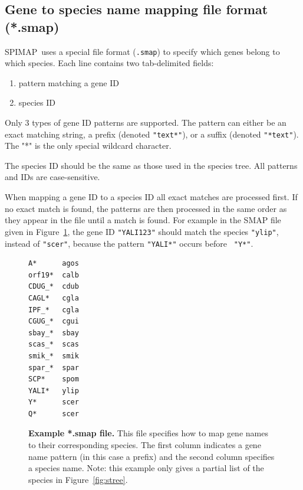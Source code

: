 \documentclass[11pt]{article}
\newcommand{\figref}[1]{Figure~\ref{#1}}
\newcommand{\spimap}{{\sf\scshape SPIMAP}}
\begin{document}
\subsection{Gene to species name mapping file format (*.smap)}
\label{sec:file:smap}

\spimap\ uses a special file format ({\tt *.smap}) to specify which
genes belong to which species. Each line contains two tab-delimited
fields: 
\begin{enumerate}[itemsep=0pt,topsep=0pt]
\item pattern matching a gene ID
\item species ID
\end{enumerate}

Only 3 types of gene ID patterns are supported.  The pattern can
either be an exact matching string, a prefix (denoted {\tt "text*"}),
or a suffix (denoted {\tt "*text"}).  The "*" is the only special
wildcard character.

The species ID should be the same as those used in the species tree.
All patterns and IDs are case-sensitive.

When mapping a gene ID to a species ID all exact matches are
processed first.  If no exact match is found, the patterns are then
processed in the same order as they appear in the file until a match
is found. For example in the SMAP file given in \figref{fig:smap}, the
gene ID {\tt "YALI123"} should match the species {\tt "ylip"}, instead of
{\tt"scer"}, because the pattern {\tt "YALI*"} occurs before {\tt
"Y*"}.


\begin{figure}
\begin{center}
\footnotesize
\begin{lstlisting}[frame=tblr]
A*      agos
orf19*  calb
CDUG_*  cdub
CAGL*   cgla
IPF_*   cgla
CGUG_*  cgui
sbay_*  sbay
scas_*  scas
smik_*  smik
spar_*  spar
SCP*    spom
YALI*   ylip
Y*      scer
Q*      scer
\end{lstlisting}
\end{center}

\caption{{\bf Example *.smap file.} This file specifies how to map
gene names to their corresponding species.  The first column indicates
a gene name pattern (in this case a prefix) and the second column specifies 
a species name.  Note: this example only gives a partial list of the species 
in \figref{fig:stree}. }
\label{fig:smap}
\end{figure}
\end{document}
